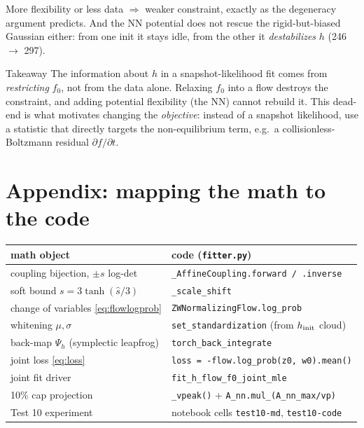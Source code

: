 \documentclass[11pt]{article}
\begin{document}
More flexibility or less data $\Rightarrow$ weaker constraint, exactly as the
degeneracy argument predicts. And the NN potential does not rescue the rigid-but-biased
Gaussian either: from one init it stays idle, from the other it \emph{destabilizes}
$h$ (246 $\to$ 297).

\begin{keybox}{Takeaway}
The information about $h$ in a snapshot-likelihood fit comes from \emph{restricting}
$f_0$, not from the data alone. Relaxing $f_0$ into a flow destroys the constraint,
and adding potential flexibility (the NN) cannot rebuild it. This dead-end is what
motivates changing the \emph{objective}: instead of a snapshot likelihood, use a
statistic that directly targets the non-equilibrium term, e.g.\ a collisionless-Boltzmann
residual $\partial f/\partial t$.
\end{keybox}

\appendix
\section{Appendix: mapping the math to the code}

\begin{center}
\begin{tabular}{l l}
\textbf{math object} & \textbf{code (\texttt{fitter.py})} \\ \hline
coupling bijection, $\pm s$ log-det & \texttt{\_AffineCoupling.forward / .inverse} \\
soft bound $s = 3\tanh(\hat s /3)$ & \texttt{\_scale\_shift} \\
change of variables \eqref{eq:flowlogprob} & \texttt{ZWNormalizingFlow.log\_prob} \\
whitening $\mu,\sigma$ & \texttt{set\_standardization} (from $h_{\rm init}$ cloud) \\
back-map $\Psi_h$ (symplectic leapfrog) & \texttt{torch\_back\_integrate} \\
joint loss \eqref{eq:loss} & \texttt{loss = -flow.log\_prob(z0, w0).mean()} \\
joint fit driver & \texttt{fit\_h\_flow\_f0\_joint\_mle} \\
10\% cap projection & \texttt{\_vpeak()} + \texttt{A\_nn.mul\_(A\_nn\_max/vp)} \\
Test 10 experiment & notebook cells \texttt{test10-md}, \texttt{test10-code} \\
\end{tabular}
\end{center}
\end{document}
